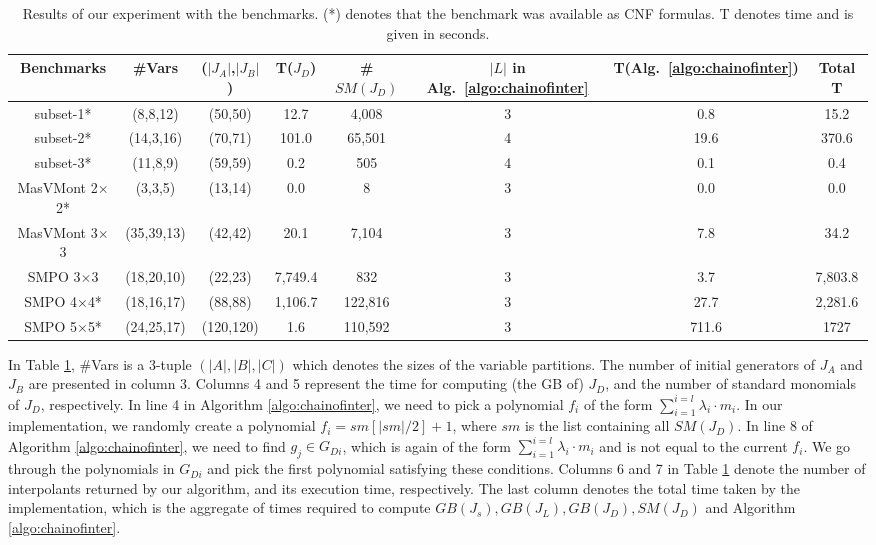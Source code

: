 \begin{table}[H]
\centering
\caption{Results of our experiment with the benchmarks. (*) denotes
that the benchmark was available as CNF formulas. T denotes 
time and is given in seconds.}
\label{exp_algo1}
\begin{tabular}{| c | c | c | c | c | c | c | c |} \hline
Benchmarks &\#Vars &($|J_A|$,$|J_B|$)& T($J_D$)& \#$SM(J_D)$&$|L|$ in Alg.~\ref{algo:chainofinter}&T(Alg.~\ref{algo:chainofinter}) & Total T\\ \hline \hline
subset-1*            &(8,8,12)&(50,50)&12.7&4,008&3&0.8&15.2 \\ \hline
subset-2*            &(14,3,16)&(70,71)&101.0&65,501&4&19.6&370.6 \\ \hline
subset-3*            &(11,8,9)&(59,59)&0.2&505&4&0.1&0.4 \\ \hline
MasVMont 2$\times$2*&(3,3,5)&(13,14)&0.0&8&3&0.0&0.0 \\ \hline
MasVMont 3$\times$3&(35,39,13)&(42,42)&20.1&7,104&3&7.8&34.2 \\ \hline
SMPO 3$\times$3     &(18,20,10)&(22,23)&7,749.4&832&3&3.7&7,803.8 \\ \hline
SMPO 4$\times$4*    &(18,16,17)&(88,88)&1,106.7&122,816&3&27.7&2,281.6 \\ \hline
SMPO 5$\times$5*   &(24,25,17)&(120,120)&1.6&110,592&3&711.6& 1727\\ \hline
\end{tabular}
\end{table}

In Table \ref{exp_algo1}, \#Vars is 
a 3-tuple $(|A|,|B|,|C|)$ which denotes the sizes of the
variable partitions. The number of initial generators of
$J_A$ and $J_B$ are presented in column 3. Columns 4 
and 5 represent the time for computing (the GB of) $J_D$, and the
number of standard monomials of  $J_D$, respectively. In line 4 
in Algorithm \ref{algo:chainofinter}, we need to pick a polynomial $f_i$ of
the form $\sum_{i=1}^{i=l}\lambda_i\cdot m_i$. In our implementation,
we randomly create a polynomial $f_i = sm[ |sm|/2 ]+1$, where $sm$ is the list 
containing all $SM(J_D)$. %
In line 8 of Algorithm \ref{algo:chainofinter}, we need to find $g_j
\in G_{Di}$, which is again of the form
$\sum_{i=1}^{i=l}\lambda_i\cdot m_i$ and is not equal to the current $f_i$. 
We go through the polynomials in $G_{Di}$ and pick the first
polynomial satisfying these conditions. Columns 6 and 7 in Table
\ref{exp_algo1} denote the number of interpolants returned by 
our algorithm, and its execution time, respectively.
The last column denotes the total time taken by the implementation,
which is the aggregate of times required to compute $GB(J_s), GB(J_L), GB(J_D),
SM(J_D)$ and Algorithm \ref{algo:chainofinter}. 

